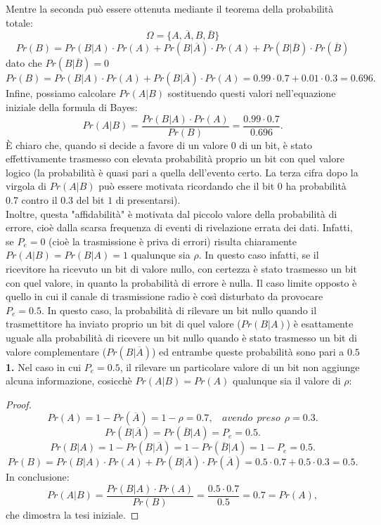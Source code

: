 \documentclass[12pt,oneside,openany]{memoir}
\numberwithin{equation}{subsection}
\begin{document}
Mentre la seconda pu\`o essere ottenuta mediante il teorema della probabilit\`a
totale:
\[
    \Omega = \{A, \overline{A}, B, \overline{B}\}
\]
\[
    Pr(B) = Pr(B | A) \cdot Pr(A) + Pr(B | \overline{A}) \cdot Pr(A) +
    Pr(B | \overline{B}) \cdot Pr(\overline{B})
\]
dato che $Pr(B | \overline{B}) = 0$
\[
    Pr(B) = Pr(B | A) \cdot Pr(A) + Pr(B | \overline{A}) \cdot Pr(A) = 0.99
    \cdot 0.7 + 0.01 \cdot 0.3 = 0.696.
\]
Infine, possiamo calcolare $Pr(A | B)$ sostituendo questi valori nell'equazione
iniziale della formula di Bayes:
\[
    Pr(A | B) = \frac{Pr(B | A) \cdot Pr(A)}{Pr(B)} =
    \frac{0.99 \cdot 0.7}{0.696}.
\]
\`E chiaro che, quando si decide a favore di un valore $0$ di un bit, \`e stato
effettivamente trasmesso con elevata probabilit\`a proprio un bit con quel
valore logico (la probabilit\`a \`e quasi pari a quella dell'evento certo. La
terza cifra dopo la virgola di $Pr(A | B)$ pu\`o essere motivata ricordando che
il bit $0$ ha probabilit\`a $0.7$ contro il $0.3$ del bit $1$ di presentarsi).\\
Inoltre, questa "affidabilit\`a" \`e motivata dal piccolo valore della
probabilit\`a di errore, cio\`e dalla scarsa frequenza di eventi di rivelazione
errata dei dati. Infatti, se $P_e = 0$ (cio\`e la trasmissione \`e priva di
errori) risulta chiaramente $Pr(A | B) = Pr(B | A) = 1$ qualunque sia $\rho$. In
questo caso infatti, se il ricevitore ha ricevuto un bit di valore nullo, con
certezza \`e stato trasmesso un bit con quel valore, in quanto la probabilit\`a
di errore \`e nulla. Il caso limite opposto \`e quello in cui il canale di
trasmissione radio \`e cos\`i disturbato da provocare $P_e = 0.5$. In questo
caso, la probabilit\`a di rilevare un bit nullo quando il trasmettitore ha
inviato proprio un bit di quel valore ($Pr(B | A)$) \`e esattamente uguale alla
probabilit\`a di ricevere un bit nullo quando \`e stato trasmesso un bit di
valore complementare ($Pr(B | \overline{A})$) ed entrambe queste probabilit\`a
sono pari a $0.5$
\bigbreak\noindent
\textbf{1.} Nel caso in cui $P_e = 0.5$, il rilevare un particolare valore di un
bit non aggiunge alcuna informazione, cosicch\`e $Pr(A | B) = Pr(A)$ qualunque
sia il valore di $\rho$:
\begin{proof}
\[
    Pr(A) = 1 - Pr(\overline{A}) = 1 - \rho = 0.7, \ \ \ \ avendo \ \ preso \ \ 
    \rho = 0.3.
\]
\[
    Pr(B | \overline{A}) = Pr(\overline{B} | A) = P_e = 0.5.
\]
\[
    Pr(B | A) = 1 - Pr(B | \overline{A}) = 1 - Pr(\overline{B} | A) = 1 - P_e =
    0.5.
\]
\[
    Pr(B) = Pr(B|A) \cdot Pr(A) + Pr(B | \overline{A}) \cdot Pr(\overline{A}) =
    0.5 \cdot 0.7 + 0.5 \cdot 0.3 = 0.5.
\]
In conclusione:
\[
    Pr(A | B) = \frac{Pr(B | A) \cdot Pr(A)}{Pr(B)} = \frac{0.5 \cdot 0.7}{0.5}
    = 0.7 = Pr(A),
\]
che dimostra la tesi iniziale.
\end{proof}
\end{document}
